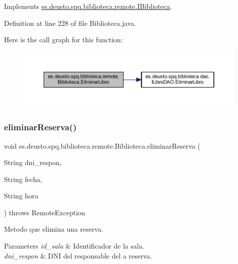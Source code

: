 Implements \mbox{\hyperlink{interfacees_1_1deusto_1_1spq_1_1biblioteca_1_1remote_1_1_i_biblioteca_addbe4ccd7324f0302e25447f2be3403a}{es.\+deusto.\+spq.\+biblioteca.\+remote.\+I\+Biblioteca}}.



Definition at line 228 of file Biblioteca.\+java.

Here is the call graph for this function\+:
\nopagebreak
\begin{figure}[H]
\begin{center}
\leavevmode
\includegraphics[width=350pt]{classes_1_1deusto_1_1spq_1_1biblioteca_1_1remote_1_1_biblioteca_aec13dff9f9d789b103b51d243e52832e_cgraph}
\end{center}
\end{figure}
\mbox{\label{classes_1_1deusto_1_1spq_1_1biblioteca_1_1remote_1_1_biblioteca_a99ad677b2d619ad4b0560daa40f351db}} 
\subsubsection{\texorpdfstring{eliminar\+Reserva()}{eliminarReserva()}}
{\footnotesize\ttfamily void es.\+deusto.\+spq.\+biblioteca.\+remote.\+Biblioteca.\+eliminar\+Reserva (\begin{DoxyParamCaption}\item[{String}]{dni\+\_\+respon,  }\item[{String}]{fecha,  }\item[{String}]{hora }\end{DoxyParamCaption}) throws Remote\+Exception}

Metodo que elimina una reserva. 
\begin{DoxyParams}{Parameters}
{\em id\+\_\+sala} & Identificador de la sala. \\
\hline
{\em dni\+\_\+respon} & D\+NI del responsable del a reserva. \\
\hline
\end{DoxyParams}


